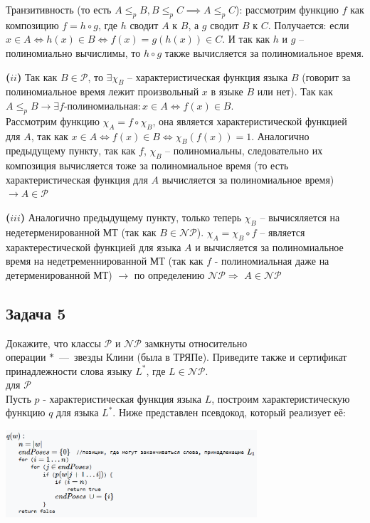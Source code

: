 \documentclass[a4paper,12pt]{article} %
\begin{document}
Транзитивность (то есть $A\leq_p B, B\leq_p C \implies A\leq_p C$): рассмотрим функцию $ f $ как композицию $ f = h \circ g $, где $ h $ сводит $ A $ к $ B $, а $ g $ сводит $ B $ к $ C $. Получается: если $ x\in A \Leftrightarrow h(x)\in B \Leftrightarrow f(x) = g(h(x))\in C $. И так как $ h $ и $ g $ -- полиномиально вычислимы, то $ h \circ g $ также вычисляется за полиномиальное время.

{\bf ($ii$)} Так как $B\in\mathcal{P}$, то $ \exists \chi_{B}$ -- характеристическая функция языка $ B $ (говорит за полиномиальное время лежит произвольный $ x $ в языке $ B $ или нет). Так как $A\leq_p B \longrightarrow \exists f \text{-полиномиальная} :x \in A \Longleftrightarrow f(x)\in B $. \\
Рассмотрим функцию $ \chi_A = f \circ \chi_{B} $, она является характеристической функцией для $ A $, так как $x \in A \Leftrightarrow f(x) \in B \Leftrightarrow \chi_B(f(x)) = 1$. Аналогично предыдущему пункту, так как $ f $, $ \chi_B $ -- полиномиальны, следовательно их композиция вычисляется тоже за полиномиальное время (то есть характеристическая функция для $A$ вычисляется за полиномиальное время) $ \longrightarrow  A\in\mathcal{P}$

{\bf ($iii$)} Аналогично предыдущему пункту, только теперь $ \chi_B $ -- вычисяляется на недетерменированной МТ (так как $B\in\mathcal{NP}$). $\chi_{A}=\chi_{B} \circ f$ -- является характерестической функцией для языка $ A $ и вычисляется за полиномиальное время на недетременнированной МТ (так как $ f $ - полиномиальная даже на детерменированной МТ) $ \longrightarrow$ по определению $ \mathcal{NP} \Rightarrow$ $A\in\mathcal{NP}$

\subsection*{Задача 5}
Докажите, что классы $\mathcal{P}$ и $\mathcal{NP}$ замкнуты относительно \\
операции $*$~---~звезды Клини (была в ТРЯПе). Приведите также и сертификат принадлежности слова языку $L^*$, где $L\in\mathcal{NP}$. \\

для $\mathcal{P}$\\
Пусть $ p $ - характеристическая функция языка $ L $, построим характеристическую функцию $ q $ для языка $L^*$. Ниже представлен псевдокод, который реализует её:
\begin{center}
\includegraphics[width=0.7\textwidth]{Code}
\end{center}
\end{document}
